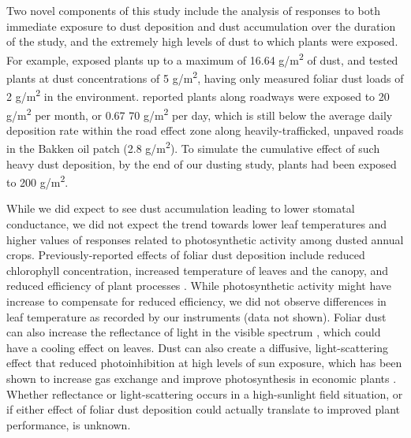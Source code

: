\documentclass{svjour3}
\begin{document}
Two novel components of this study include the analysis of responses to both immediate exposure to dust deposition and dust accumulation over the duration of the study, and the extremely high levels of dust to which plants were exposed. 
For example, \citet{bao2015} exposed plants up to a maximum of 16.64 g/m\textsuperscript{2} of dust, and \citet{thompson1984} tested plants at dust concentrations of 5 g/m\textsuperscript{2}, having only measured foliar dust loads of 2 g/m\textsuperscript{2} in the environment. 
\citet{matsuki2016} reported plants along roadways were exposed to 20 g/m\textsuperscript{2} per month, or 0.67 70 g/m\textsuperscript{2} per day, which is still below the average daily deposition rate within the road effect zone along heavily-trafficked, unpaved roads in the Bakken oil patch (2.8 g/m\textsuperscript{2}). 
To simulate the cumulative effect of such heavy dust deposition, by the end of our dusting study, plants had been exposed to 200 g/m\textsuperscript{2}.

While we did expect to see dust accumulation leading to lower stomatal conductance, we did not expect the trend towards lower leaf temperatures and higher values of responses related to photosynthetic activity among dusted annual crops. 
Previously-reported effects of foliar dust deposition include reduced chlorophyll concentration, increased temperature of leaves and the canopy, and reduced efficiency of plant processes \citep{eller1977, ulrichs2008,zia-khan2014, sarma2017}. 
While photosynthetic activity might have increase to compensate for reduced efficiency, we did not observe differences in leaf temperature as recorded by our instruments (data not shown). 
Foliar dust can also increase the reflectance of light in the visible spectrum \citep{wu2016}, which could have a cooling effect on leaves. 
Dust can also create a diffusive, light-scattering effect that reduced photoinhibition at high levels of sun exposure, which has been shown to increase gas exchange and improve photosynthesis in economic plants \citep{jifon2003, kromdijk2016}. 
Whether reflectance or light-scattering occurs in a high-sunlight field situation, or if either effect of foliar dust deposition could actually translate to improved plant performance, is unknown. 
\end{document}
